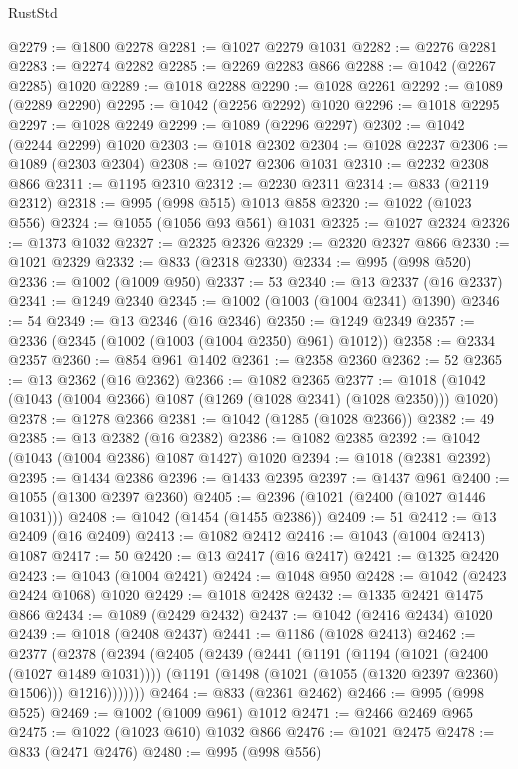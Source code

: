 \begin{lexlean}{RustStd}
\begin{coremodule}
@2279 := @1800 @2278
@2281 := @1027 @2279 @1031
@2282 := @2276 @2281
@2283 := @2274 @2282
@2285 := @2269 @2283 @866
@2288 := @1042 (@2267 @2285) @1020
@2289 := @1018 @2288
@2290 := @1028 @2261
@2292 := @1089 (@2289 @2290)
@2295 := @1042 (@2256 @2292) @1020
@2296 := @1018 @2295
@2297 := @1028 @2249
@2299 := @1089 (@2296 @2297)
@2302 := @1042 (@2244 @2299) @1020
@2303 := @1018 @2302
@2304 := @1028 @2237
@2306 := @1089 (@2303 @2304)
@2308 := @1027 @2306 @1031
@2310 := @2232 @2308 @866
@2311 := @1195 @2310
@2312 := @2230 @2311
@2314 := @833 (@2119 @2312)
@2318 := @995 (@998 @515) @1013 @858
@2320 := @1022 (@1023 @556)
@2324 := @1055 (@1056 @93 @561) @1031
@2325 := @1027 @2324
@2326 := @1373 @1032
@2327 := @2325 @2326
@2329 := @2320 @2327 @866
@2330 := @1021 @2329
@2332 := @833 (@2318 @2330)
@2334 := @995 (@998 @520)
@2336 := @1002 (@1009 @950)
@2337 := 53
@2340 := @13 @2337 (@16 @2337)
@2341 := @1249 @2340
@2345 := @1002 (@1003 (@1004 @2341) @1390)
@2346 := 54
@2349 := @13 @2346 (@16 @2346)
@2350 := @1249 @2349
@2357 := @2336 (@2345 (@1002 (@1003 (@1004 @2350) @961) @1012))
@2358 := @2334 @2357
@2360 := @854 @961 @1402
@2361 := @2358 @2360
@2362 := 52
@2365 := @13 @2362 (@16 @2362)
@2366 := @1082 @2365
@2377 := @1018 (@1042 (@1043 (@1004 @2366) @1087 (@1269 (@1028 @2341) (@1028 @2350))) @1020)
@2378 := @1278 @2366
@2381 := @1042 (@1285 (@1028 @2366))
@2382 := 49
@2385 := @13 @2382 (@16 @2382)
@2386 := @1082 @2385
@2392 := @1042 (@1043 (@1004 @2386) @1087 @1427) @1020
@2394 := @1018 (@2381 @2392)
@2395 := @1434 @2386
@2396 := @1433 @2395
@2397 := @1437 @961
@2400 := @1055 (@1300 @2397 @2360)
@2405 := @2396 (@1021 (@2400 (@1027 @1446 @1031)))
@2408 := @1042 (@1454 (@1455 @2386))
@2409 := 51
@2412 := @13 @2409 (@16 @2409)
@2413 := @1082 @2412
@2416 := @1043 (@1004 @2413) @1087
@2417 := 50
@2420 := @13 @2417 (@16 @2417)
@2421 := @1325 @2420
@2423 := @1043 (@1004 @2421)
@2424 := @1048 @950
@2428 := @1042 (@2423 @2424 @1068) @1020
@2429 := @1018 @2428
@2432 := @1335 @2421 @1475 @866
@2434 := @1089 (@2429 @2432)
@2437 := @1042 (@2416 @2434) @1020
@2439 := @1018 (@2408 @2437)
@2441 := @1186 (@1028 @2413)
@2462 := @2377
    (@2378
      (@2394
        (@2405
          (@2439
            (@2441
              (@1191
                (@1194 (@1021 (@2400 (@1027 @1489 @1031))))
                (@1191 (@1498 (@1021 (@1055 (@1320 @2397 @2360) @1506))) @1216)))))))
@2464 := @833 (@2361 @2462)
@2466 := @995 (@998 @525)
@2469 := @1002 (@1009 @961) @1012
@2471 := @2466 @2469 @965
@2475 := @1022 (@1023 @610) @1032 @866
@2476 := @1021 @2475
@2478 := @833 (@2471 @2476)
@2480 := @995 (@998 @556)

\end{coremodule}
\end{lexlean}
